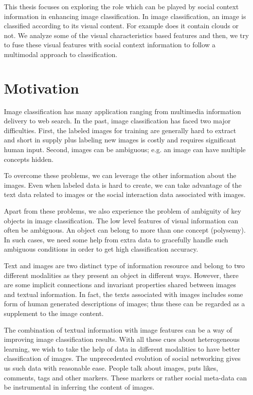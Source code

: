 This thesis focuses on exploring the role which can be played 
by social context information in enhancing image classification. 
In image classification, an image is classified according to its 
visual content. For example does it contain clouds or not. We 
analyze some of the visual characteristics based features and then, 
we try to fuse these visual features with social context 
information to follow a multimodal approach to classification. 
\section{Motivation}
Image classification has many application ranging from multimedia 
information delivery to web search. In the past, image 
classification has faced two major difficulties. First, the labeled 
images for training are generally hard to extract and short in 
supply plus labeling new images is costly and requires significant
human input. Second, images can be ambiguous; e.g. an image can have 
multiple concepts hidden. 

To overcome these problems, we can leverage the other information 
about the images. Even when labeled data is hard to create, we can 
take advantage of the text data related to images or the social 
interaction data associated with images.

Apart from these problems, we also experience the problem of 
ambiguity of key objects in image classification. The low level 
features of visual information can often be ambiguous. An object can 
belong to more than one concept (polysemy). In such cases, we need 
some help from extra data to gracefully handle such ambiguous 
conditions in order to get high classification accuracy.

Text and images are two distinct type of information resource and 
belong to two different modalities as they present an object in 
different ways. However, there are some implicit connections and 
invariant properties shared between images and textual information. In fact, the texts associated with images 
includes some form of human generated descriptions of images; thus 
these can be regarded as a supplement to the image content.

The combination of textual information with image features can be a way of improving image classification results. With all these cues about heterogeneous learning, we wish
to take the help of data in different modalities to 
have better classification of images. The unprecedented evolution of 
social networking gives us such data with reasonable ease. People talk 
about images, puts likes, comments, tags and other markers. 
These markers or rather social meta-data can be 
instrumental in inferring the content of images.

